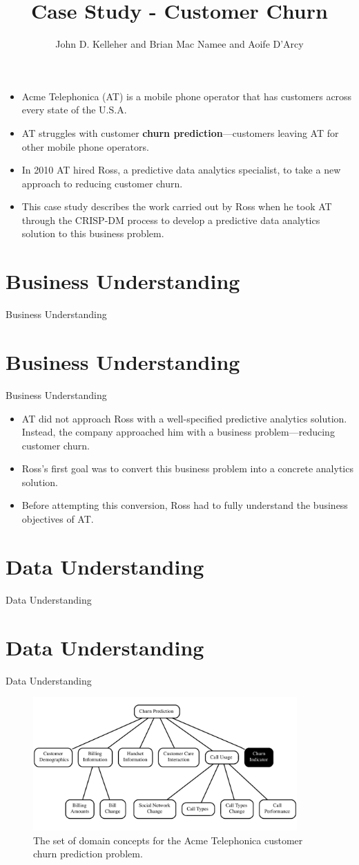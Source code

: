 \documentclass[xcolor={table}]{beamer}
\title{Case Study - Customer Churn}
\author{John D. Kelleher and Brian Mac Namee and Aoife D'Arcy}
\institute{}
\date{}
\newcommand{\SectionSlide}[2][]{
	\ifthenelse{\isempty{#1}}
		{\section{#2}\begin{frame} \begin{center}\begin{huge}#2\end{huge}\end{center}\end{frame}}
		{\section[#1]{#2}\begin{frame} \begin{center}\begin{huge}#2\end{huge}\end{center}\end{frame}}
}
\newcommand{\keyword}[1]{\alert{\textbf{#1}}\index{#1}}
\begin{document}
\begin{frame}
	\titlepage
\end{frame}
\begin{frame}
	 \tableofcontents
\end{frame}

 \begin{frame} 
 \begin{itemize}
\item Acme Telephonica (AT) is a mobile phone operator that has customers across every state of the U.S.A. 
\item AT struggles with customer \keyword{churn prediction}---customers leaving AT for other mobile phone operators. 
\item In 2010 AT hired Ross, a predictive data analytics specialist, to take a new approach to reducing customer churn. 
\item This case study describes the work carried out by Ross when he took AT through the CRISP-DM process to develop a predictive data analytics  solution to this business problem. 
 \end{itemize}
 \end{frame} 
 
\SectionSlide{Business  Understanding}

 \begin{frame} 
 \begin{itemize}
\item AT did not approach Ross with a well-specified predictive analytics solution. Instead, the company approached him with a business problem---reducing customer churn. 
\item Ross's first goal was to convert this business problem into a concrete analytics solution. 
\item Before attempting this conversion, Ross had to fully understand the business objectives of AT. 
 \end{itemize}
 \end{frame} 
 
\SectionSlide{Data Understanding}


 \begin{frame} 
\begin{figure}[htb]
	\centering
	\includegraphics[width=0.9\textwidth]{./images/acmetelephone_mod.pdf}
	\caption{The set of domain concepts for the Acme Telephonica customer churn prediction problem.}
	\label{fig:ATChurnPredictionDataConcepts}
\end{figure}
\end{frame} 
\end{document}
